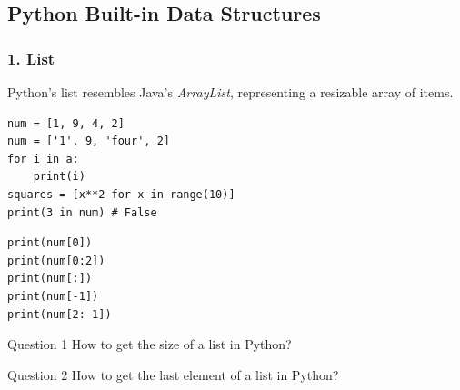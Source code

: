 \documentclass[aspectratio=169, 14pt]{beamer}
\begin{document}
{
    \begin{frame}
        \section{\textcolor{darkmidnightblue}{Python Built-in Data Structures}}
    \end{frame}
}

\begin{frame}[fragile]
    \frametitle{1. List}
    Python's \alert{list} resembles Java's \emph{ArrayList}, representing a resizable array of items.

    \begin{verbatim}
num = [1, 9, 4, 2]        
num = ['1', 9, 'four', 2]
for i in a:
    print(i)
squares = [x**2 for x in range(10)]
print(3 in num) # False
    \end{verbatim}    
\end{frame}

\begin{frame}[fragile]
    \begin{verbatim}
print(num[0])
print(num[0:2])
print(num[:])
print(num[-1])
print(num[2:-1])    
    \end{verbatim}

\begin{exampleblock}{Question 1}
    How to get the size of a list in Python?
\end{exampleblock}

\begin{exampleblock}{Question 2}
How to get the last element of a list in Python?
\end{exampleblock}

\end{frame}
\end{document}
